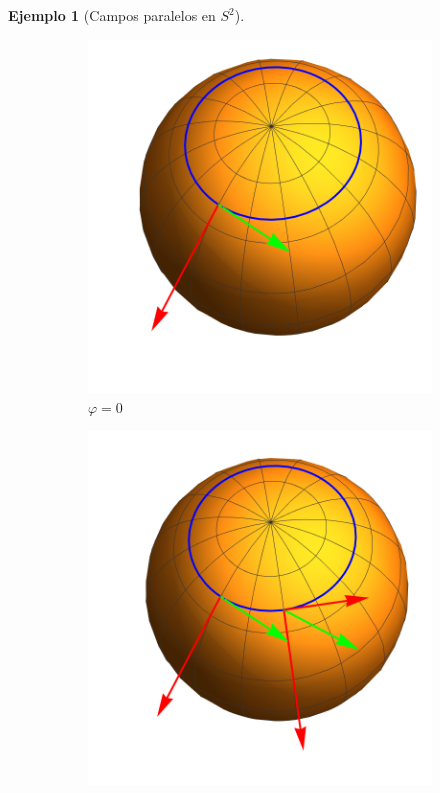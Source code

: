 \documentclass[spanish]{book}
\theoremstyle{definition}
\newtheorem*{ejem}{Ejemplo}
\begin{document}
\begin{ejem}[Campos paralelos en $S^2$]
		\begin{figure}[H]
			\begin{center}
				\begin{subfigure}[t]{0.4\linewidth}
					\centering
					\includegraphics[width=\linewidth]{fig15a}
					\caption*{$\varphi=0$}
				\end{subfigure}
				\begin{subfigure}[t]{0.4\linewidth}
					\centering
					\includegraphics[width=\linewidth]{fig15b}

\end{subfigure}
\end{center}
\end{figure}
\end{ejem}
\end{document}
